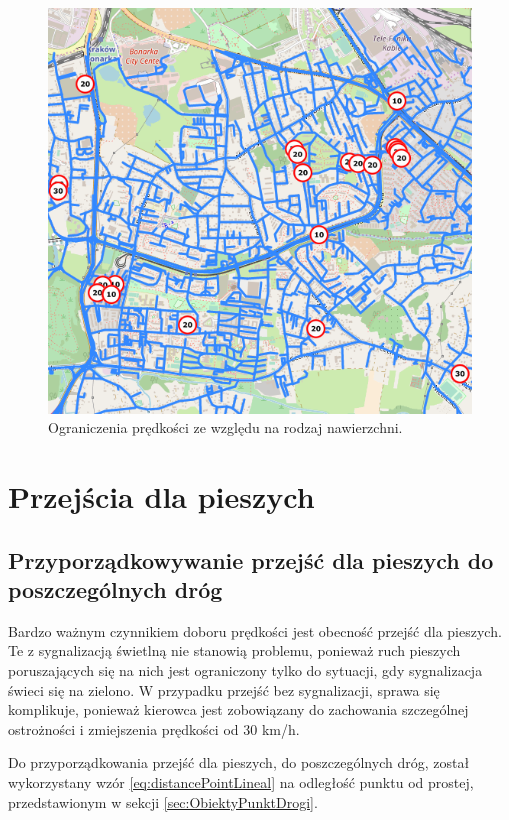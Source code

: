 \begin{figure}[h]
\caption{Ograniczenia prędkości ze względu na rodzaj nawierzchni.}
\label{sec:surfaceTypePhoto}
\centering
\includegraphics[width=1\textwidth]{surfaceType}
\end{figure}

\newpage
\section{Przejścia dla pieszych}
\label{sec:pedestrialCrossing}
\subsection{Przyporządkowywanie przejść dla pieszych do poszczególnych dróg}

Bardzo ważnym czynnikiem doboru prędkości jest obecność przejść dla pieszych. Te z sygnalizacją świetlną nie stanowią problemu, ponieważ ruch pieszych poruszających się na nich jest ograniczony tylko do sytuacji, gdy sygnalizacja świeci się na zielono. W przypadku przejść bez sygnalizacji, sprawa się komplikuje, ponieważ kierowca jest zobowiązany do zachowania szczególnej ostrożności i zmiejszenia prędkości od 30 km/h.

Do przyporządkowania przejść dla pieszych, do poszczególnych dróg, został wykorzystany wzór \ref{eq:distancePointLineal} na odległość punktu od prostej, przedstawionym w sekcji \ref{sec:ObiektyPunktDrogi}.


